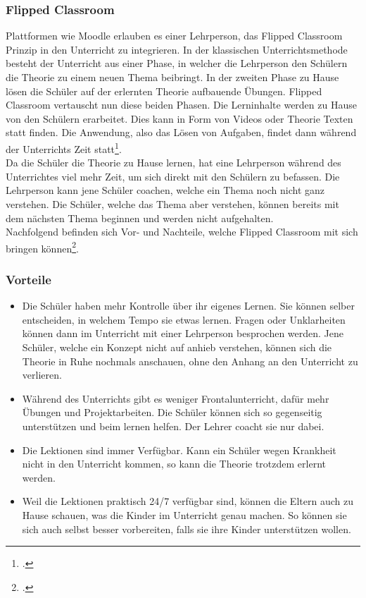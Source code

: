 \subsubsection{Flipped Classroom}
Plattformen wie Moodle erlauben es einer Lehrperson, das Flipped Classroom Prinzip in den Unterricht zu integrieren. In der klassischen Unterrichtsmethode besteht der Unterricht aus einer Phase, in welcher die Lehrperson den Schülern die Theorie zu einem neuen Thema beibringt. In der zweiten Phase zu Hause lösen die Schüler auf der erlernten Theorie aufbauende Übungen. Flipped Classroom vertauscht nun diese beiden Phasen. Die Lerninhalte werden zu Hause von den Schülern erarbeitet. Dies kann in Form von Videos oder Theorie Texten statt finden. Die Anwendung, also das Lösen von Aufgaben, findet dann während der Unterrichts Zeit statt\footcite{flipped_classroom_theorie}. \\

Da die Schüler die Theorie zu Hause lernen, hat eine Lehrperson während des Unterrichtes viel mehr Zeit, um sich direkt mit den Schülern zu befassen. Die Lehrperson kann jene Schüler coachen, welche ein Thema noch nicht ganz verstehen. Die Schüler, welche das Thema aber verstehen, können bereits mit dem nächsten Thema beginnen und werden nicht aufgehalten. \\

Nachfolgend befinden sich Vor- und Nachteile, welche Flipped Classroom mit sich bringen können\footcite{flipped_classroom_pro_con}.

\subsubsection*{Vorteile}
\begin{itemize}
	\item Die Schüler haben mehr Kontrolle über ihr eigenes Lernen. Sie können selber entscheiden, in welchem Tempo sie etwas lernen. Fragen oder Unklarheiten können dann im Unterricht mit einer Lehrperson besprochen werden. Jene Schüler, welche ein Konzept nicht auf anhieb verstehen, können sich die Theorie in Ruhe nochmals anschauen, ohne den Anhang an den Unterricht zu verlieren.
	\item Während des Unterrichts gibt es weniger Frontalunterricht, dafür mehr Übungen und Projektarbeiten. Die Schüler können sich so gegenseitig unterstützen und beim lernen helfen. Der Lehrer coacht sie nur dabei.
	\item Die Lektionen sind immer Verfügbar. Kann ein Schüler wegen Krankheit nicht in den Unterricht kommen, so kann die Theorie trotzdem erlernt werden. 
	\item Weil die Lektionen praktisch 24/7 verfügbar sind, können die Eltern auch zu Hause schauen, was die Kinder im Unterricht genau machen. So können sie sich auch selbst besser vorbereiten, falls sie ihre Kinder unterstützen wollen. 
\end{itemize}

